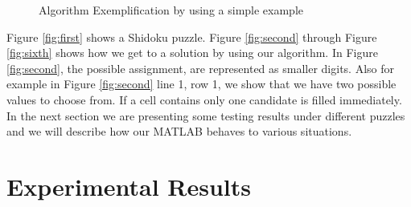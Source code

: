 \documentclass[12pt,a4paper]{article} %
\begin{document}
\begin{figure}[ht!]
\begin{center}
%
\end{center}
\caption{%
Algorithm Exemplification by using a simple example
}%
\end{figure}
Figure \ref{fig:first} shows a Shidoku puzzle. Figure \ref{fig:second} through Figure \ref{fig:sixth} shows how we get to a solution by using our algorithm. In Figure \ref{fig:second}, the possible assignment, are represented as smaller digits. Also for example in Figure \ref{fig:second} line 1, row 1, we show that we have two possible values to choose from. If a cell contains only one candidate is filled immediately.
\newline
\\ In the next section we are presenting some testing results under different puzzles and we will describe how our MATLAB behaves to various situations.
\section{Experimental Results}
\end{document}
